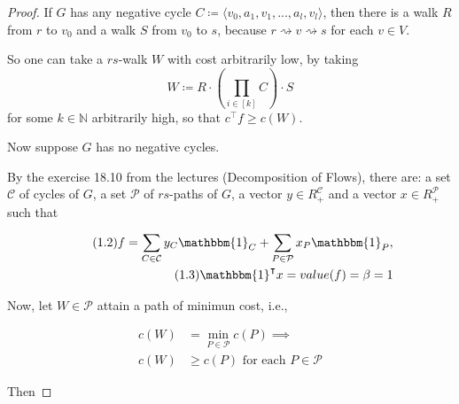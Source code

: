 \documentclass[a4paper,10pt, leqno]{article}
\theoremstyle{definition}
\begin{document}
\begin{proof}

If $G$ has any negative cycle $C \coloneqq \langle v_0, a_1, v_1, ..., a_l, v_l \rangle$, then there is a walk $R$ from $r$ to $v_0$ and a walk $S$ from $v_0$ to $s$, because $r \rightsquigarrow v \rightsquigarrow s$ for each $v \in V$.

So one can take a $rs$-walk $W$ with cost arbitrarily low, by taking
$$W \coloneqq R \cdotp (\prod_{i \in [k]}{C}) \cdotp S $$
for some $k \in \mathbb{N}$ arbitrarily high, so that $c^{\intercal}f \geq c(W)$.

Now suppose $G$ has no negative cycles.

 By the exercise 18.10 from the lectures (Decomposition of Flows), there are: a set $\mathcal{C}$ of cycles of $G$, a set $\mathcal{P}$ of $rs$-paths of $G$, a vector $y \in R_+^{\mathcal{C}}$ and a vector $x \in R_+^{\mathcal{P}}$ such that
 
\begin{align*}
  \tag{1.2} f = \sum_{C \in \mathcal{C}}{y_C \mathbbm{1}_C} + \sum_{P \in \mathcal{P}}{x_P \mathbbm{1}_P}, \\
  \tag{1.3} \mathbbm{1}^{\intercal}x = value(f) = \beta = 1
\end{align*}

 
 Now, let $W \in \mathcal{P}$ attain a path of minimun cost, i.e.,

\begin{align*}
  c(W) &= \min_{P \in \mathcal{P}}{c(P)} \implies \\
  \tag{1.4} c(W) &\geq c(P) \text{ for each } P \in \mathcal{P}
\end{align*}

Then


\end{proof}
\end{document}
